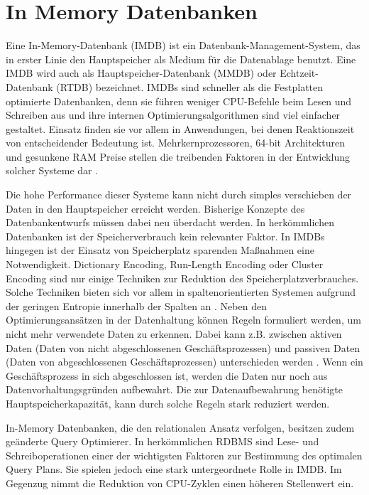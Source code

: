\section{In Memory Datenbanken}
\label{ch:grundlagen:sec:InMemoryDatenbanken}

Eine In-Memory-Datenbank (IMDB) ist ein Datenbank-Management-System, das in erster Linie den Hauptspeicher als Medium für die Datenablage benutzt. Eine IMDB wird auch als Hauptspeicher-Datenbank (MMDB) oder Echtzeit-Datenbank (RTDB) bezeichnet. IMDBs sind schneller als die Festplatten optimierte Datenbanken, denn sie führen weniger CPU-Befehle beim Lesen und Schreiben aus und ihre internen Optimierungsalgorithmen sind viel einfacher gestaltet. Einsatz finden sie vor allem in Anwendungen, bei denen Reaktionszeit von entscheidender Bedeutung ist. Mehrkernprozessoren, 64-bit Architekturen und gesunkene RAM Preise stellen die treibenden Faktoren in der Entwicklung solcher Systeme dar \cite{SWB-381840476}.

Die hohe Performance dieser Systeme kann nicht durch simples verschieben der Daten in den Hauptspeicher erreicht werden. Bisherige Konzepte des Datenbankentwurfs müssen dabei neu überdacht werden. In herkömmlichen Datenbanken ist der Speicherverbrauch kein relevanter Faktor. In IMDBs hingegen ist der Einsatz von Speicherplatz sparenden Maßnahmen eine Notwendigkeit. Dictionary Encoding, Run-Length Encoding oder Cluster Encoding sind nur einige Techniken zur Reduktion des Speicherplatzverbrauches. Solche Techniken bieten sich vor allem in spaltenorientierten Systemen aufgrund der geringen Entropie innerhalb der Spalten an \cite{Abadi:2006:ICE:1142473.1142548}. Neben den Optimierungsansätzen in der Datenhaltung können Regeln formuliert werden, um nicht mehr verwendete Daten zu erkennen. Dabei kann z.B. zwischen aktiven Daten (Daten von nicht abgeschlossenen Geschäftsprozessen) und passiven Daten (Daten von abgeschlossenen Geschäftsprozessen) unterschieden werden \cite{10.1109/ICDE.2013.6544811}. Wenn ein Geschäftsprozess in sich abgeschlossen ist, werden die Daten nur noch aus Datenvorhaltungsgründen aufbewahrt. Die zur Datenaufbewahrung benötigte Hauptspeicherkapazität, kann durch solche Regeln stark reduziert werden.
 
In-Memory Datenbanken, die den relationalen Ansatz verfolgen, besitzen zudem geänderte Query Optimierer. In herkömmlichen RDBMS sind Lese- und Schreiboperationen einer der wichtigsten Faktoren zur Bestimmung des optimalen Query Plans. Sie spielen jedoch eine stark untergeordnete Rolle in IMDB. Im Gegenzug nimmt die Reduktion von CPU-Zyklen einen höheren Stellenwert ein.

